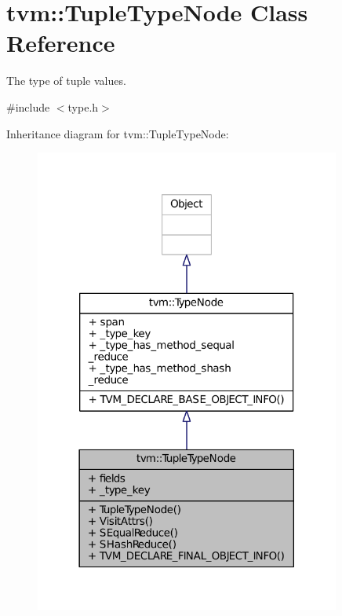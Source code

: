 \hypertarget{classtvm_1_1TupleTypeNode}{}\section{tvm\+:\+:Tuple\+Type\+Node Class Reference}
\label{classtvm_1_1TupleTypeNode}


The type of tuple values.  




{\ttfamily \#include $<$type.\+h$>$}



Inheritance diagram for tvm\+:\+:Tuple\+Type\+Node\+:
\nopagebreak
\begin{figure}[H]
\begin{center}
\leavevmode
\includegraphics[width=285pt]{classtvm_1_1TupleTypeNode__inherit__graph}
\end{center}
\end{figure}


